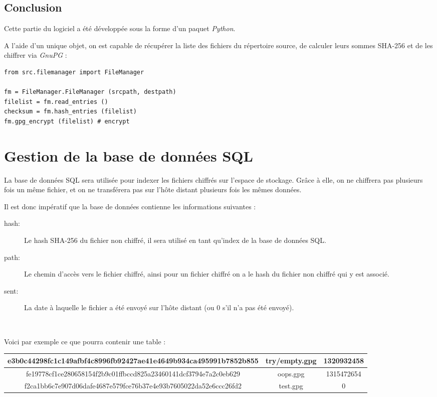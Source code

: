 \subsection{Conclusion}

Cette partie du logiciel a été développée sous la forme d'un paquet \textit{Python}.

A l'aide d'un unique objet, on est capable de récupérer la liste des fichiers du répertoire
source, de calculer leurs sommes SHA-256 et de les chiffrer via \textit{GnuPG} :

\begin{verbatim}
from src.filemanager import FileManager

fm = FileManager.FileManager (srcpath, destpath)
filelist = fm.read_entries ()
checksum = fm.hash_entries (filelist)
fm.gpg_encrypt (filelist) # encrypt
\end{verbatim}

\section{Gestion de la base de données SQL}

La base de données SQL sera utilisée pour indexer les fichiers chiffrés sur l'espace de stockage.
Grâce à elle, on ne chiffrera pas plusieurs fois un même fichier, et on ne transférera pas sur
l'hôte distant plusieurs fois les mêmes données.

Il est donc impératif que la base de données contienne les informations suivantes :

\begin{description}
     \item[hash:] Le hash SHA-256 du fichier non chiffré, il sera utilisé en tant qu'index de la
               base de données SQL.
     \item[path:] Le chemin d'accès vers le fichier chiffré, ainsi pour un fichier chiffré on a le
               hash du fichier non chiffré qui y est associé.
     \item[sent:] La date à laquelle le fichier a été envoyé sur l'hôte distant (ou 0 s'il n'a pas
               été envoyé).
\end{description} ~

Voici par exemple ce que pourra contenir une table :

\noindent \begin{tabular}{| c | c | c |}
     \hline
     e3b0c44298fc1c149afbf4c8996fb92427ae41e4649b934ca495991b7852b855 & try/empty.gpg & 1320932458 \\ \hline
     fe19778cf1ce280658154f2b9c01ffbccd825a23460141dcf3794e7a2c0eb629 & oops.gpg & 1315472654 \\ \hline
     f2ca1bb6c7e907d06dafe4687e579fce76b37e4e93b7605022da52e6ccc26fd2 & test.gpg & 0 \\ \hline
\end{tabular} ~ \newline \newline

